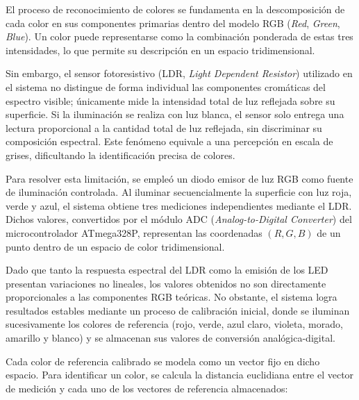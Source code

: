 
El proceso de reconocimiento de colores se fundamenta en la descomposición de cada color en sus componentes primarias dentro del modelo RGB (\textit{Red}, \textit{Green}, \textit{Blue}). Un color puede representarse como la combinación ponderada de estas tres intensidades, lo que permite su descripción en un espacio tridimensional.  

\vspace{1em}

Sin embargo, el sensor fotoresistivo (LDR, \textit{Light Dependent Resistor}) utilizado en el sistema no distingue de forma individual las componentes cromáticas del espectro visible; únicamente mide la intensidad total de luz reflejada sobre su superficie. Si la iluminación se realiza con luz blanca, el sensor solo entrega una lectura proporcional a la cantidad total de luz reflejada, sin discriminar su composición espectral. Este fenómeno equivale a una percepción en escala de grises, dificultando la identificación precisa de colores.

\vspace{1em}

Para resolver esta limitación, se empleó un diodo emisor de luz RGB como fuente de iluminación controlada. Al iluminar secuencialmente la superficie con luz roja, verde y azul, el sistema obtiene tres mediciones independientes mediante el LDR. Dichos valores, convertidos por el módulo ADC (\textit{Analog-to-Digital Converter}) del microcontrolador ATmega328P, representan las coordenadas $(R, G, B)$ de un punto dentro de un espacio de color tridimensional.

\vspace{1em}

Dado que tanto la respuesta espectral del LDR como la emisión de los LED presentan variaciones no lineales, los valores obtenidos no son directamente proporcionales a las componentes RGB teóricas. No obstante, el sistema logra resultados estables mediante un proceso de calibración inicial, donde se iluminan sucesivamente los colores de referencia (rojo, verde, azul claro, violeta, morado, amarillo y blanco) y se almacenan sus valores de conversión analógica-digital.

\vspace{1em}

Cada color de referencia calibrado se modela como un vector fijo en dicho espacio. Para identificar un color, se calcula la distancia euclidiana entre el vector de medición y cada uno de los vectores de referencia almacenados:


